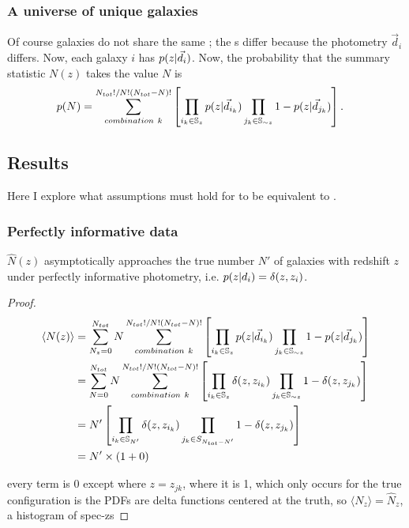 \subsubsection{A universe of unique galaxies}

Of course galaxies do not share the same \pzpdf; the \pzpdf s differ because the photometry $\vec{d}_{i}$ differs.
Now, each galaxy $i$ has $p(z \vert \vec{d}_{i})$.
Now, the probability that the summary statistic $N(z)$ takes the value $N$ is 
\begin{align}
\eqlabel{eq:general}
p(N) &= \sum_{combination\ k}^{N_{tot}! / N! (N_{tot} - N)!} \left[ \prod_{i_{k} \in \mathbb{S}_{z}} p(z \gvn \data_{i_{k}}) \prod_{j_{k} \in \mathbb{S}_{\sim z}} 1 - p(z \gvn \data_{j_{k}}) \right] .
\end{align}

\subsection{Results}

Here I explore what assumptions must hold for  to be equivalent to .

\subsubsection{Perfectly informative data}

\begin{theorem}
	$\hat{N}(z)$ asymptotically approaches the true number $N'$ of galaxies with redshift $z$ under perfectly informative photometry, i.e. $p(z \vert d_{i}) = \delta(z, z_{i})$.
\end{theorem}
\begin{proof}
\begin{align}
\label{eq:data}
\langle N(z) \rangle &= \sum_{N_{z} = 0}^{N_{tot}} N \sum_{combination\ k}^{N_{tot}! / N! (N_{tot} - N)!} \left[ \prod_{i_{k} \in \mathbb{S}_{z}} p(z \vert \vec{d}_{i_{k}}) \prod_{j_{k} \in \mathbb{S}_{\sim z}} 1 - p(z \vert \vec{d}_{j_{k}}) \right]\\
&= \sum_{N = 0}^{N_{tot}} N \sum_{combination\ k}^{N_{tot}! / N! (N_{tot} - N)!} \left[ \prod_{i_{k} \in \mathbb{S}_{z}} \delta(z, z_{i_{k}}) \prod_{j_{k} \in \mathbb{S}_{\sim z}} 1 - \delta(z, z_{j_{k}}) \right]\\
&= N' \left[ \prod_{i_{k} \in \mathbb{S}_{N'}} \delta(z, z_{i_{k}}) \prod_{j_{k} \in S_{N_{tot} -N'}} 1 - \delta(z, z_{j_{k}}) \right]\\
&= N' \times (1 + 0)\\
\end{align}

every term is 0 except where $z=z_{jk}$, where it is 1, which only occurs for the true configuration is the PDFs are delta functions centered at the truth, so $\langle N_{z}\rangle = \hat{N}_{z}$, a histogram of spec-zs
\end{proof}


